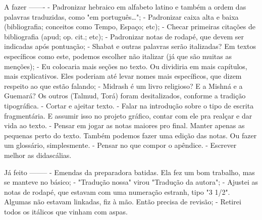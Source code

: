 A fazer
-------
- Padronizar hebraico em alfabeto latino e também a ordem das palavras traduzidas, como "em português…";
- Padronizar caixa alta e baixa (bibliografia; conceitos como Tempo, Espaço; etc);
- Checar primeiras citações de bibliografia (apud; op. cit.; etc);
- Padronizar notas de rodapé, que devem ser indicadas após pontuação;
- Shabat e outras palavras serão italizadas? Em textos específicos como este, podemos escolher não italizar (já que são muitas as menções);
- Eu colocaria mais seções no texto. Ou dividiria em mais capítulos, mais explicativos. Eles poderiam até levar nomes mais específicos, que dizem respeito ao que estão falando;
- Midrash é um livro religioso? E a Mishná e a Guemará? Os outros (Talmud, Torá) foram desitalizados, conforme a tradição tipográfica.
- Cortar e ajeitar texto.
- Falar na introdução sobre o tipo de escrita fragmentária. E assumir isso no projeto gráfico, contar com ele pra realçar e dar vida ao texto.
- Pensar em jogar as notas maiores pro final. Manter apenas as pequenas perto do texto. Também podemos fazer uma edição das notas. Ou fazer um glossário, simplesmente.
- Pensar no que compor o apêndice.
- Escrever melhor as didascálias.

Já feito
--------
- Emendas da preparadora batidas. Ela fez um bom trabalho, mas se manteve no básico;
- "Tradução nossa" virou "Tradução da autora";
- Ajustei as notas de rodapé, que estavam com uma numeração estranh, tipo "3 1/2". Algumas não estavam linkadas, fiz à mão. Então precisa de revisão;
- Retirei todos os itálicos que vinham com aspas.